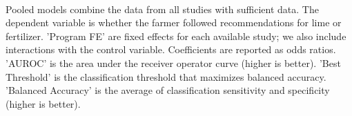 \begin{table}[H] \centering
{}

\caption{Replicated Heterogeneity Logit Models: Fertilizer}
\\ \parbox{0.79\linewidth}{\tiny Pooled models combine the data from all studies with sufficient data. The dependent variable is whether the farmer followed recommendations for lime or fertilizer. 'Program FE' are fixed effects for each available study; we also include interactions with the control variable. Coefficients are reported as odds ratios. 'AUROC' is the area under the receiver operator curve (higher is better). 'Best Threshold' is the classification threshold that maximizes balanced accuracy. 'Balanced Accuracy' is the average of classification sensitivity and specificity (higher is better).}
\end{table}

